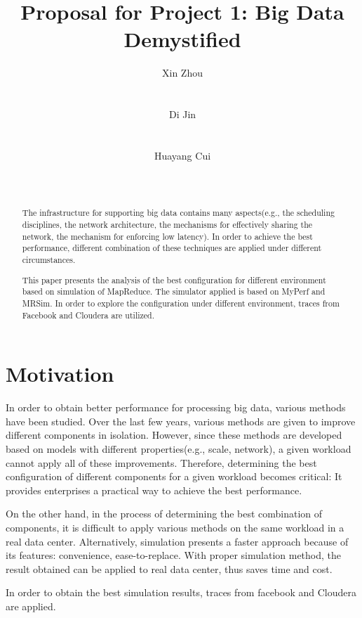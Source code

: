 \documentclass{Project}
\begin{document}
\title{Proposal for Project 1: Big Data Demystified}
\author{
\alignauthor
Xin Zhou\\
       \\
       \\
\alignauthor Di Jin\\
       \\
       \\
\alignauthor
Huayang Cui\\
       \\
       \\
}

\maketitle
\begin{abstract}
  The infrastructure for supporting big data contains many aspects(e.g., the scheduling disciplines, the network architecture, the mechanisms for effectively sharing the network, the mechanism for enforcing low latency). In order to achieve the best performance, different combination of these techniques are applied under different circumstances.\par
  This paper presents the analysis of the best configuration for different environment based on simulation of MapReduce. The simulator applied is based on MyPerf and MRSim. In order to explore the configuration under different environment, traces from Facebook and Cloudera are utilized.
\end{abstract}


\section{Motivation}
In order to obtain better performance for processing big data, various methods have been studied. Over the last few years, various methods are given to improve different components in isolation. However, since these methods are developed based on models with different properties(e.g., scale, network), a given workload cannot apply all of these improvements. Therefore, determining the best configuration of different components for a given workload becomes critical: It provides enterprises a practical way to achieve the best performance. \par
On the other hand, in the process of determining the best combination of components, it is difficult to apply various methods on the same workload in a real data center. Alternatively, simulation presents a faster approach because of its features: convenience, ease-to-replace. With proper simulation method, the result obtained can be applied to real data center, thus saves time and cost.\par
In order to obtain the best simulation results, traces from facebook and Cloudera are applied.
\end{document}
